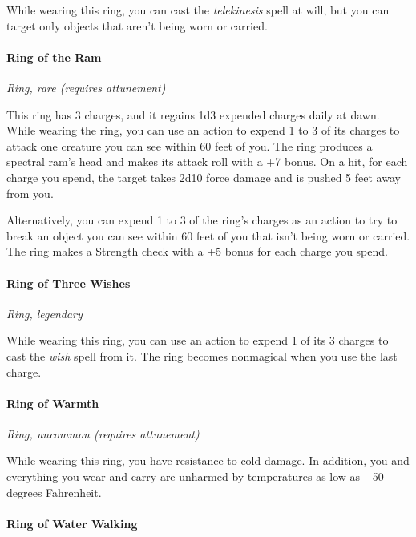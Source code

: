 \documentclass[
]{article}
\begin{document}
While wearing this ring, you can cast the \emph{telekinesis} spell at
will, but you can target only objects that aren't being worn or carried.

\hypertarget{ring-of-the-ram}{%
\paragraph{Ring of the Ram}\label{ring-of-the-ram}}

\emph{Ring, rare (requires attunement)}

This ring has 3 charges, and it regains 1d3 expended charges daily at
dawn. While wearing the ring, you can use an action to expend 1 to 3 of
its charges to attack one creature you can see within 60 feet of you.
The ring produces a spectral ram's head and makes its attack roll with a
+7 bonus. On a hit, for each charge you spend, the target takes 2d10
force damage and is pushed 5 feet away from you.

Alternatively, you can expend 1 to 3 of the ring's charges as an action
to try to break an object you can see within 60 feet of you that isn't
being worn or carried. The ring makes a Strength check with a +5 bonus
for each charge you spend.

\hypertarget{ring-of-three-wishes}{%
\paragraph{Ring of Three Wishes}\label{ring-of-three-wishes}}

\emph{Ring, legendary}

While wearing this ring, you can use an action to expend 1 of its 3
charges to cast the \emph{wish} spell from it. The ring becomes
nonmagical when you use the last charge.

\hypertarget{ring-of-warmth}{%
\paragraph{Ring of Warmth}\label{ring-of-warmth}}

\emph{Ring, uncommon (requires attunement)}

While wearing this ring, you have resistance to cold damage. In
addition, you and everything you wear and carry are unharmed by
temperatures as low as −50 degrees Fahrenheit.

\hypertarget{ring-of-water-walking}{%
\paragraph{Ring of Water Walking}\label{ring-of-water-walking}}
\end{document}

